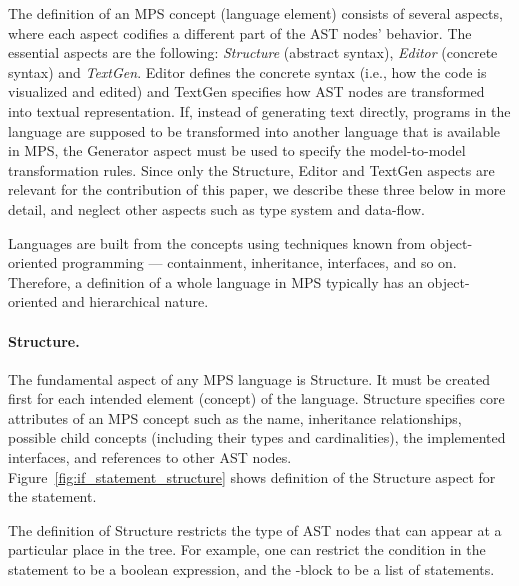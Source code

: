 The definition of an MPS concept (language element) consists of several aspects, where each aspect codifies a different part of the AST nodes' behavior.
The essential aspects are the following: \emph{Structure} (abstract syntax), \emph{Editor} (concrete syntax) and \emph{TextGen}.
Editor defines the concrete syntax (i.e., how the code is visualized and edited) and TextGen specifies how AST nodes are transformed into textual representation.
If, instead of generating text directly, programs in the language are supposed to be transformed into another language that is available in MPS, the Generator aspect must be used to specify the model-to-model transformation rules.
Since only the Structure, Editor and TextGen aspects are relevant for the contribution of this paper, we describe these three below in more detail, and neglect other aspects such as type system and data-flow.

Languages are built from the concepts using techniques known from object-oriented programming --- containment, inheritance, interfaces, and so on.
Therefore, a definition of a whole language in MPS typically has an object-oriented and hierarchical nature.

\paragraph{Structure.}
The fundamental aspect of any MPS language is Structure.
It must be created first for each intended element (concept) of the language.
Structure specifies core attributes of an MPS concept such as the name, inheritance relationships, possible child concepts (including their types and cardinalities), the implemented interfaces, and references to other AST nodes.
Figure~\ref{fig:if_statement_structure} shows definition of the Structure aspect for the  statement.

The definition of Structure restricts the type of AST nodes that can appear at a particular place in the tree.
For example, one can restrict the condition in the  statement to be a boolean expression, and the -block to be a list of statements.

